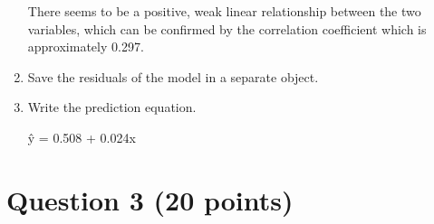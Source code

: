 \documentclass[12pt,letterpaper]{article}
\begin{document}
\begin{enumerate}
		 
		There seems to be a positive, weak linear relationship between the two variables, which can be confirmed by the correlation coefficient which is approximately 0.297.
		
		\item Save the residuals of the model in a separate object.	
		
		 
		
		\item Write the prediction equation.
		
		\^{y} = 0.508 + 0.024x
		
		
	\end{enumerate}
		
\section*{Question 3 (20 points)}
\end{document}
